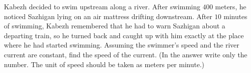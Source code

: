 Kabezh decided to swim upstream along a river. After swimming $400$ meters, he noticed Sazhigan lying on an air mattress drifting downstream. After $10$ minutes of swimming, Kabezh remembered that he had to warn Sazhigan about a departing train, so he turned back and caught up with him exactly at the place where he had started swimming. Assuming the swimmer's speed and the river current are constant, find the speed of the current. (In the answer write only the number. The unit of speed should be taken as meters per minute.)
